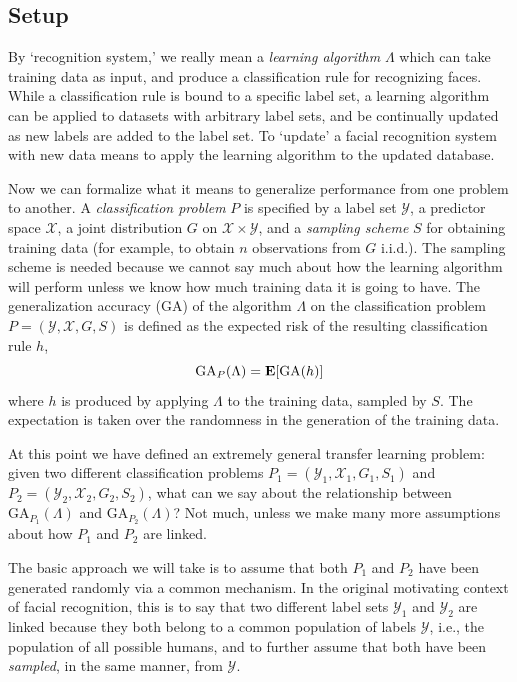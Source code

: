 \subsection{Setup}
By `recognition system,' we really mean a \emph{learning algorithm}
$\Lambda$ which can take training data as input, and produce a
classification rule for recognizing faces.  While a classification
rule is bound to a specific label set, a learning algorithm can be
applied to datasets with arbitrary label sets, and be continually
updated as new labels are added to the label set.  To `update' a
facial recognition system with new data means to apply the learning
algorithm to the updated database.

Now we can formalize what it means to generalize performance from one
problem to another.  A \emph{classification problem} $P$ is specified
by a label set $\mathcal{Y}$, a predictor space $\mathcal{X}$, a joint
distribution $G$ on $\mathcal{X} \times \mathcal{Y}$, and a
\emph{sampling scheme} $S$ for obtaining training data (for example,
to obtain $n$ observations from $G$ i.i.d.).  The sampling scheme is
needed because we cannot say much about how the learning algorithm
will perform unless we know how much training data it is going to
have.  The generalization accuracy (GA) of the algorithm $\Lambda$ on the
classification problem $P = (\mathcal{Y}, \mathcal{X}, G, S)$ is
defined as the expected risk of the resulting classification rule $h$,
\[
\text{GA}_P(\Lambda) = \textbf{E}[\text{GA}(h)]
\]
where $h$ is produced by applying $\Lambda$ to the training data,
sampled by $S$.  The expectation is taken over the randomness in the
generation of the training data.

At this point we have defined an extremely general transfer learning
problem: given two different classification problems $P_1 =
(\mathcal{Y}_1, \mathcal{X}_1, G_1, S_1)$ and $P_2 = (\mathcal{Y}_2,
\mathcal{X}_2, G_2, S_2)$, what can we say about the relationship
between $\text{GA}_{P_1}(\Lambda)$ and $\text{GA}_{P_2}(\Lambda)$?
Not much, unless we make many more assumptions about how $P_1$ and
$P_2$ are linked.

The basic approach we will take is to assume that both $P_1$ and $P_2$
have been generated randomly via a common mechanism.  In the original
motivating context of facial recognition, this is to say that two
different label sets $\mathcal{Y}_1$ and $\mathcal{Y}_2$ are linked
because they both belong to a common population of labels
$\mathcal{Y}$, i.e., the population of all possible humans, and to
further assume that both have been \emph{sampled}, in the same manner,
from $\mathcal{Y}$.

